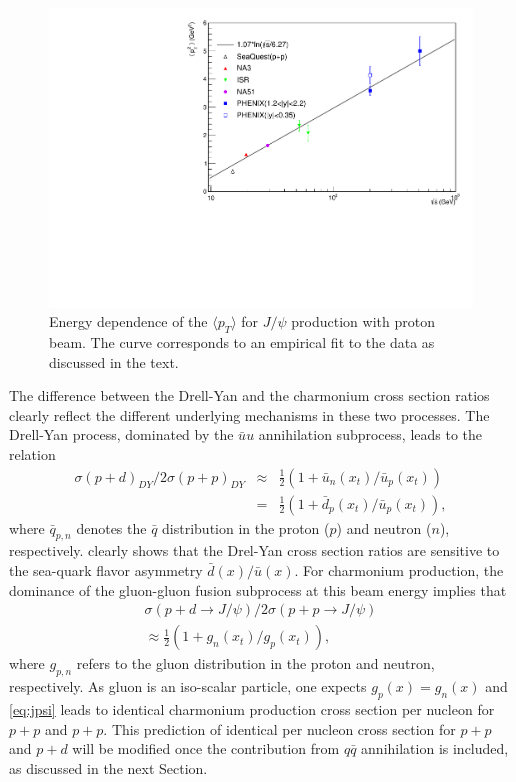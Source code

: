 \documentclass[reprint,aps,unsortedaddress,superscriptaddress,prl,floatfix,showpacs,linenumbers]{revtex4-2}
\begin{document}
\begin{figure}[tb]
	\includegraphics*[width=\linewidth]{crossSections/pT/pT_s_release}
	\caption{Energy dependence of the $\langle p_T \rangle$
		for $J/\psi$ production with proton beam. The curve corresponds to
		an empirical fit to the data
		as discussed in the text.}
	\label{fig6}
\end{figure}


The difference between the Drell-Yan and the charmonium
cross section ratios clearly reflect the different underlying mechanisms in
these two processes. The Drell-Yan process, dominated by the
$\bar u u$  annihilation subprocess, leads to the relation
\begin{align}
	\sigma(p+d)_{DY}/2\sigma(p+p)_{DY} & \approx &
	\frac{1}{2} (1+ \bar u_n(x_t)/\bar u_p(x_t)) \nonumber                                        \\
	                                   & =       & \frac{1}{2} (1 + \bar d_p(x_t)/\bar u_p(x_t)),
	\label{eq:DY}
\end{align}
where $\bar q_{p,n}$ denotes the $\bar q$ distribution in the proton ($p$)
and neutron ($n$), respectively.  clearly shows that the Drel-Yan
cross section ratios are sensitive to the sea-quark flavor asymmetry
$\bar d(x) / \bar u(x)$. For charmonium production, the dominance of the
gluon-gluon fusion subprocess at this beam energy implies that
\begin{align}
	\sigma(p+d \to J/\psi)/2\sigma(p+p \to J/\psi) \nonumber \\
	\approx \frac{1}{2} (1+ g_n(x_t)/g_p(x_t)),
	\label{eq:jpsi}
\end{align}
where $g_{p,n}$ refers to the gluon distribution in the proton
and neutron, respectively. As gluon is an iso-scalar particle, one expects
$g_p(x) = g_n(x)$ and \cref{eq:jpsi} leads to identical charmonium production cross
section per nucleon for $p+p$ and $p+p$. This prediction of identical
per nucleon cross section for $p+p$ and $p+d$ will be modified once the
contribution from $q \bar q$ annihilation is included, as discussed in the
next Section.
\end{document}
